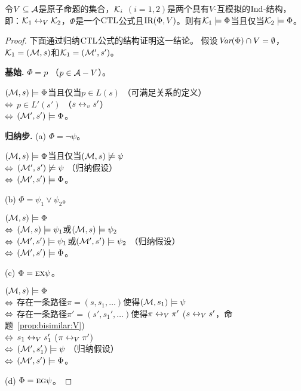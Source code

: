 \begin{theorem}\label{thm:V-bisimulation:EQ}
	令$V\subseteq {\cal A}$是原子命题的集合，${\cal K}_i$ $(i=1,2)$是两个具有$V$-互模拟的$\textrm{Ind}$-结构，即：${\cal K}_1 \leftrightarrow_V {\cal K}_2$，$\Phi$是一个$\textrm{CTL}$公式且$\textrm{IR}(\Phi, V)$。则有${\cal K}_1\models \Phi$当且仅当${\cal K}_2\models \Phi$。
\end{theorem}
\begin{proof}
	下面通过归纳$\textrm{CTL}$公式的结构证明这一结论。
	假设$\textit{Var}(\Phi) \cap V=\emptyset$，${\cal K}_1=({\cal M},s)$和${\cal K}_1=({\cal M}',s')$。
	
	\textbf{基始.} $\Phi = p$ （$p\in {\cal A} -V$）。
	
	$({\cal M},s)\models \Phi$当且仅当$p\in L(s)$ \hfill （可满足关系的定义）\\
	$\Leftrightarrow$ $p\in L'(s')$ \hfill （$s \leftrightarrow_v s'$）\\
	$\Leftrightarrow$ $({\cal M}',s') \models \Phi$。
	
	\textbf{归纳步.} (a) $\Phi = \neg \psi$。
	
	$({\cal M},s)\models \Phi$当且仅当$({\cal M},s) \not \models \psi$\\
	$\Leftrightarrow$ $({\cal M}',s')\not \models \psi$  \hfill （归纳假设）\\
	$\Leftrightarrow$ $({\cal M}',s') \models \Phi$。
	
	(b) $\Phi = \psi_1 \vee \psi_2$。
	
	$({\cal M},s)\models \Phi$\\
	$\Leftrightarrow$ $({\cal M},s) \models \psi_1$或$({\cal M},s) \models \psi_2$\\
	$\Leftrightarrow$ $({\cal M}',s')  \models \psi_1$或$({\cal M}',s') \models \psi_2$ \hfill （归纳假设）\\
	$\Leftrightarrow$ $({\cal M}',s') \models \Phi$。
	
	(c) $\Phi=\textsc{e}\textsc{x}\psi$。
	
	$({\cal M},s)\models \Phi$\\
	$\Leftrightarrow$ 存在一条路径$\pi=(s,s_1,\dots)$使得$({\cal M},s_1)\models \psi$\\
	$\Leftrightarrow$ 存在一条路径$\pi'=(s',s_1',\dots)$使得$\pi \leftrightarrow_V \pi'$ \hfill ($s \leftrightarrow_V s'$，命题~\ref{prop:bisimilar:V})\\
	$\Leftrightarrow$ $s_1 \leftrightarrow_V s_1'$ \hfill ($\pi \leftrightarrow_V \pi'$)\\
	$\Leftrightarrow$ $({\cal M}',s_1') \models \psi$   \hfill   （归纳假设）\\
	$\Leftrightarrow$ $({\cal M}',s')\models \Phi$。
	
	(d) $\Phi = \textsc{e} \textsc{g} \psi$。
	

\end{proof}
